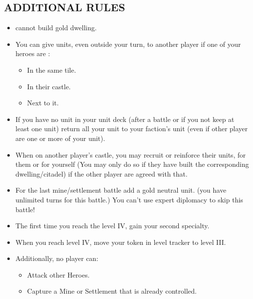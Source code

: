 \begin{multicols*}{2}
\subsection*{\MakeUppercase{Additional Rules}}
\begin{itemize}
    \item cannot build gold dwelling.
    \item You can give units, even outside your turn, to another player if one of your heroes are :
    \begin{itemize}
        \item In the same tile. 
        \item In their castle.
        \item Next to it.
    \end{itemize}
    \item If you have no unit in your unit deck (after a battle or if you not keep at least one unit) return all your unit to your faction's unit (even if other player are one or more of your unit).
    \item When on another player's castle, you may recruit or reinforce their units, for them or for yourself (You may only do so if they have built the corresponding dwelling/citadel) if the other player are agreed with that.
    \item For the last mine/settlement battle add a gold neutral unit. (you have unlimited turns for this battle.) You can't use expert diplomacy to skip this battle!
    \item The first time you reach the level IV, gain your second specialty.
    \item When you reach level IV, move your token in level tracker to level III.
    \item Additionally, no player can:
    \begin{itemize}
        \item Attack other Heroes.
        \item Capture a Mine or Settlement that is already controlled.
    \end{itemize}
\end{itemize}

\end{multicols*}

\newpage


